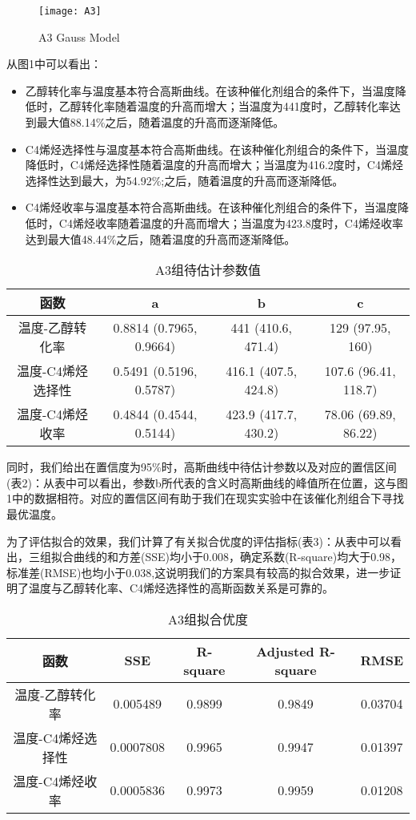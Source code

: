 \documentclass[withoutpreface,bwprint]{cumcmthesis} %
\begin{document}
\begin{figure}[!h]
	\centering
	\texttt{[image: A3]}
	\caption{A3 Gauss Model }
	\label{fig:B7}
\end{figure}

\newpage
从图1中可以看出：
\begin{itemize}
	\item 乙醇转化率与温度基本符合高斯曲线。在该种催化剂组合的条件下，当温度降低时，乙醇转化率随着温度的升高而增大；当温度为441度时，乙醇转化率达到最大值88.14\%之后，随着温度的升高而逐渐降低。
	\item C4烯烃选择性与温度基本符合高斯曲线。在该种催化剂组合的条件下，当温度降低时，C4烯烃选择性随着温度的升高而增大；当温度为416.2度时，C4烯烃选择性达到最大，为54.92\%;之后，随着温度的升高而逐渐降低。
	\item C4烯烃收率与温度基本符合高斯曲线。在该种催化剂组合的条件下，当温度降低时，C4烯烃收率随着温度的升高而增大；当温度为423.8度时，C4烯烃收率达到最大值48.44\%之后，随着温度的升高而逐渐降低。
\end{itemize}

\begin{table}[!htbp]
	\caption{A3组待估计参数值}\label{tab:001} \centering
	\begin{tabular}{cccc}
		\toprule[1.5pt]
		函数& a & b & c \\
		\midrule[1pt]
		温度-乙醇转化率 & 0.8814  (0.7965, 0.9664) & 441  (410.6, 471.4) & 129  (97.95, 160)\\
		温度-C4烯烃选择性 & 0.5491  (0.5196, 0.5787) & 416.1  (407.5, 424.8) & 107.6  (96.41, 118.7) \\
		温度-C4烯烃收率 & 0.4844  (0.4544, 0.5144) & 423.9  (417.7, 430.2)& 78.06  (69.89, 86.22)\\
		\bottomrule[1.5pt]
	\end{tabular}
\end{table}

同时，我们给出在置信度为95\%时，高斯曲线中待估计参数以及对应的置信区间(表2)：从表中可以看出，参数b所代表的含义时高斯曲线的峰值所在位置，这与图1中的数据相符。对应的置信区间有助于我们在现实实验中在该催化剂组合下寻找最优温度。

为了评估拟合的效果，我们计算了有关拟合优度的评估指标(表3)：从表中可以看出，三组拟合曲线的和方差(SSE)均小于0.008，确定系数(R-square)均大于0.98，标准差(RMSE)也均小于0.038,这说明我们的方案具有较高的拟合效果，进一步证明了温度与乙醇转化率、C4烯烃选择性的高斯函数关系是可靠的。

\begin{table}[!htbp]
	\caption{A3组拟合优度}\label{tab:001} \centering
	\begin{tabular}{ccccc}
		\toprule[1.5pt]
		函数& SSE & R-square & Adjusted R-square & RMSE \\
		\midrule[1pt]
		温度-乙醇转化率 &  0.005489 & 0.9899 & 0.9849 &   0.03704\\
		温度-C4烯烃选择性 &  0.0007808 & 0.9965 &  0.9947 & 0.01397 \\
		温度-C4烯烃收率 & 0.0005836 & 0.9973&  0.9959 & 0.01208\\
		\bottomrule[1.5pt]
	\end{tabular}
\end{table}
\end{document}
